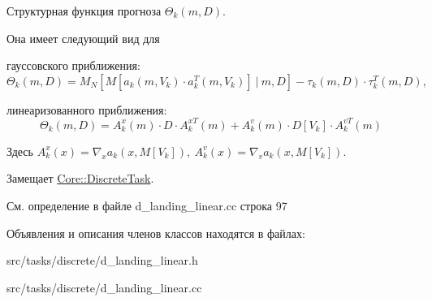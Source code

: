Структурная функция прогноза $\Theta_k(m, D)$. 

Она имеет следующий вид для


\begin{DoxyItemize}
\item гауссовского приближения\+: \[\Theta_k(m, D) = M_N[M[a_k(m, V_k)\cdot a_k^T(m, V_k)]\ |\ m, D] - \tau_k(m,D) \cdot \tau_k^T(m, D),\]
\item линеаризованного приближения\+: \[\Theta_k(m, D) = A_k^x(m) \cdot D \cdot A_k^{xT}(m) + A_k^v(m) \cdot D[V_k] \cdot A_k^{v T}(m)\]
\end{DoxyItemize}

Здесь $A_k^x(x) = \nabla_x a_k(x,M[V_k]),\ A_k^v(x) = \nabla_v a_k(x,M[V_k])$. 

Замещает \hyperlink{class_core_1_1_discrete_task_a18906155257c5febd937f2f0c633e5ed}{Core\+::\+Discrete\+Task}.



См. определение в файле d\+\_\+landing\+\_\+linear.\+cc строка 97



Объявления и описания членов классов находятся в файлах\+:\begin{DoxyCompactItemize}
\item 
src/tasks/discrete/d\+\_\+landing\+\_\+linear.\+h\item 
src/tasks/discrete/d\+\_\+landing\+\_\+linear.\+cc\end{DoxyCompactItemize}
